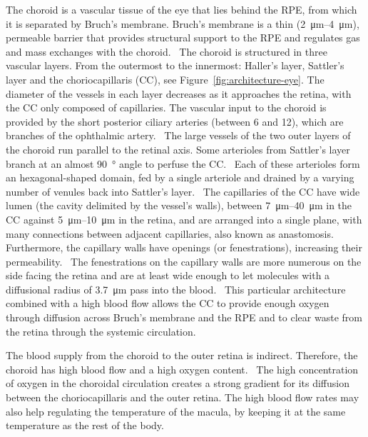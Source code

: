 \documentclass[12pt,a4paper]{journal}
\begin{document}
The choroid is a vascular tissue of the eye that lies behind the RPE, from which it is separated by Bruch's membrane.
Bruch's membrane is a thin (\SIrange{2}{4}{\micro\meter}), permeable barrier that provides structural support to the RPE and regulates gas and mass exchanges with the choroid.~\cite{Curcio_2013}
The choroid is structured in three vascular layers.
From the outermost to the innermost: Haller's layer, Sattler's layer and the choriocapillaris (CC), see Figure~\ref{fig:architecture-eye}.
The diameter of the vessels in each layer decreases as it approaches the retina, with the CC only composed of capillaries.
The vascular input to the choroid is provided by the short posterior ciliary arteries (between 6 and 12), which are branches of the ophthalmic artery.~\cite{Kiel_2010}
The large vessels of the two outer layers of the choroid run parallel to the retinal axis.
Some arterioles from Sattler's layer branch at an almost \SI{90}{\degree} angle to perfuse the CC.~\cite{Nickla_2010}
Each of these arterioles form an hexagonal-shaped domain, fed by a single arteriole and drained by a varying number of venules back into Sattler's layer.~\cite{Zouache_2016}
The capillaries of the CC have wide lumen (the cavity delimited by the vessel's walls), between \SIrange{7}{40}{\micro\meter} in the CC against \SIrange{5}{10}{\micro\meter} in the retina, and are arranged into a single plane, with many connections between adjacent capillaries, also known as anastomosis.~\cite{Bill_1983, ChanLing_2011,Fryczkowski_1994}
Furthermore, the capillary walls have openings (or fenestrations), increasing their permeability.~\cite{Nickla_2010}
The fenestrations on the capillary walls are more numerous on the side facing the retina and are at least wide enough to let molecules with a diffusional radius of \SI{3.7}{\micro\meter} pass into the blood.~\cite{Nickla_2010, Bill_1983}
This particular architecture combined with a high blood flow allows the CC to provide enough oxygen through diffusion across Bruch's membrane and the RPE and to clear waste from the retina through the systemic circulation.

The blood supply from the choroid to the outer retina is indirect.
Therefore, the choroid has high blood flow and a high oxygen content.~\cite{Bill_1983}
The high concentration of oxygen in the choroidal circulation creates a strong gradient for its diffusion between the choriocapillaris and the outer retina.
The high blood flow rates may also help regulating the temperature of the macula, by keeping it at the same temperature as the rest of the body.~\cite{Bill_1983, Parver_1991}
\end{document}
